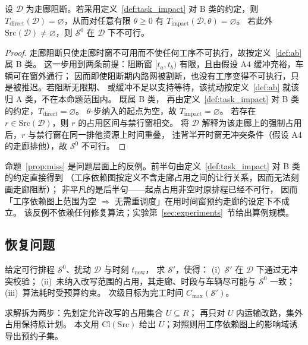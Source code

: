 \begin{prop}[B 类上工序依赖图给出空范围]
\label{prop:miss}
设 \(\mathcal{D}\) 为走廊阻断。若采用定义~\ref{def:task_impact} 对 B 类的约定，则
\(T_{\mathrm{direct}}(\mathcal{D})=\varnothing\)，从而对任意有限 \(\theta\ge 0\) 有
\(T_{\mathrm{impact}}(\mathcal{D},\theta)=\varnothing\)。
若此外 \(\mathrm{Src}(\mathcal{D})\neq\varnothing\)，则 \(\mathcal{S}^0\) 在 \(\mathcal{D}\) 下不可行。
\end{prop}

\begin{proof}
走廊阻断只使走廊时窗不可用而不使任何工序不可执行，故按定义~\ref{def:ab} 属 B 类。
这一步用到两条前提：阻断窗 \([t_a,t_b)\) 有限，且由假设 A4 缓冲充裕，车辆可在窗外通行；
因而即使阻断期内路网被割断，也没有工序变得不可执行，只是被推迟。若阻断无限期、
或缓冲不足以支持等待，该扰动按定义~\ref{def:ab} 就该归 A 类，不在本命题范围内。
既属 B 类，
再由定义~\ref{def:task_impact} 对 B 类的约定，\(T_{\mathrm{direct}}=\varnothing\)。
\(\theta\)-步纳入的起点为空，故 \(T_{\mathrm{impact}}=\varnothing\)。
若存在 \(r\in\mathrm{Src}(\mathcal{D})\)，则 \(r\) 的占用区间与禁行窗相交。
将 \(\mathcal{D}\) 解释为该走廊上的强制占用后，\(r\) 与禁行窗在同一排他资源上时间重叠，
违背半开时窗无冲突条件（假设 A4 的走廊排他），故 \(\mathcal{S}^0\) 不可行。
\end{proof}

命题~\ref{prop:miss} 是问题层面上的反例。前半句由定义~\ref{def:task_impact} 对 B 类的约定直接得到
（工序依赖图按定义不含走廊占用之间的让行关系，因而无法刻画走廊阻断）；
非平凡的是后半句——起点占用非空时原排程已经不可行，
因而「工序依赖图上范围为空 \(\Rightarrow\) 无需重调度」在用时间窗预约走廊的设定下不成立。
该反例不依赖任何修复算法；实验第~\ref{sec:experiments}~节给出算例规模。

\subsection{恢复问题}
\label{sec:recovery_problem}

\begin{problem}[按预约表划定范围的有界修复]
\label{prob:recovery}
给定可行排程 \(\mathcal{S}^0\)、扰动 \(\mathcal{D}\) 与时刻 \(t_{\mathrm{now}}\)，
求 \(\mathcal{S}'\)，使得：
(i)~\(\mathcal{S}'\) 在 \(\mathcal{D}\) 下通过无冲突校验；
(ii)~未纳入改写范围的占用，其走廊、时段与车辆尽可能与 \(\mathcal{S}^0\) 一致；
(iii)~算法耗时受预算约束。
次级目标为完工时间 \(C_{\max}(\mathcal{S}')\)。
\end{problem}

求解拆为两步：先划定允许改写的占用集合 \(U\subseteq R\)；
再只对 \(U\) 内运输改路，集外占用保持原计划。
本文用 \(\mathrm{Cl}(\mathrm{Src})\) 给出 \(U\)；对照则用工序依赖图上的影响域诱导出预约子集。


